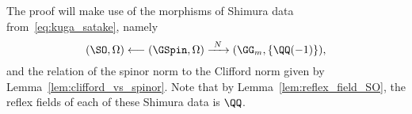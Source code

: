 The proof will make use of the morphisms of Shimura data from~\eqref{eq:kuga_satake}, namely
$$
(\SO,\Omega) \longleftarrow (\GSpin,\Omega) \xrightarrow{\ N \ } (\GG_m,\{\QQ(-1)\}),
$$
and the relation of the spinor norm to the Clifford norm given by Lemma~\ref{lem:clifford_vs_spinor}. Note that by Lemma~\ref{lem:reflex_field_SO}, the reflex fields of each of these Shimura data is $\QQ$.



%

